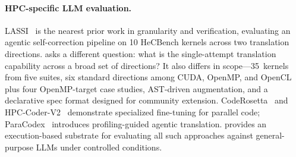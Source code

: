 
\paragraph{HPC-specific LLM evaluation.}
LASSI~\cite{LASSI2024} is the nearest prior work in granularity and verification, evaluating an agentic self-correction pipeline on 10 HeCBench kernels across two translation directions. \parbench{} asks a different question: what is the single-attempt translation capability across a broad set of directions? It also differs in scope---35~kernels from five suites, six standard directions among CUDA, OpenMP, and OpenCL plus four OpenMP-target case studies, AST-driven augmentation, and a declarative spec format designed for community extension. CodeRosetta~\cite{CodeRosetta2024} and HPC-Coder-V2~\cite{HPCCoderV2} demonstrate specialized fine-tuning for parallel code; ParaCodex~\cite{ParaCodex2026} introduces profiling-guided agentic translation. \parbench{} provides an execution-based substrate for evaluating all such approaches against general-purpose LLMs under controlled conditions.

